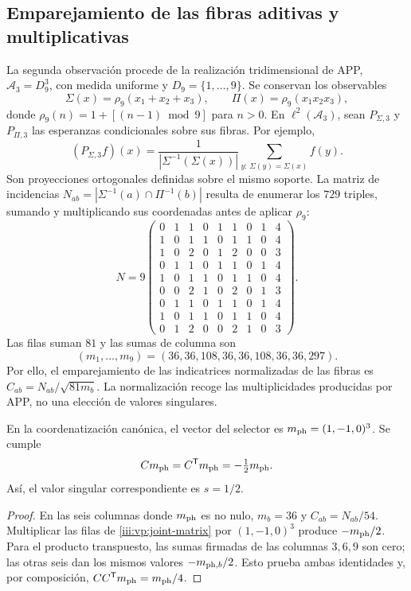 \subsection{Emparejamiento de las fibras aditivas y multiplicativas}

La segunda observación procede de la realización tridimensional de APP,
$\mathcal A_3=D_9^3$, con medida uniforme y
$D_9=\{1,\ldots,9\}$. Se conservan los observables
\[
 \Sigma(x)=\rho_9(x_1+x_2+x_3),\qquad
 \Pi(x)=\rho_9(x_1x_2x_3),
\]
donde $\rho_9(n)=1+[(n-1)\bmod9]$ para $n>0$. En
$\ell^2(\mathcal A_3)$, sean $P_{\Sigma,3}$ y $P_{\Pi,3}$ las
esperanzas condicionales sobre sus fibras. Por ejemplo,
\[
 (P_{\Sigma,3}f)(x)=
 \frac1{|\Sigma^{-1}(\Sigma(x))|}
 \sum_{y:\,\Sigma(y)=\Sigma(x)}f(y).
\]
Son proyecciones ortogonales definidas sobre el mismo soporte. La matriz
de incidencias $N_{ab}=|\Sigma^{-1}(a)\cap\Pi^{-1}(b)|$ resulta de
enumerar los $729$ triples, sumando y multiplicando sus coordenadas antes
de aplicar $\rho_9$:
\begin{equation}
 N=9\begin{pmatrix}
 0&1&1&0&1&1&0&1&4\\
 1&0&1&1&0&1&1&0&4\\
 1&0&2&0&1&2&0&0&3\\
 0&1&1&0&1&1&0&1&4\\
 1&0&1&1&0&1&1&0&4\\
 0&0&2&1&0&2&0&1&3\\
 0&1&1&0&1&1&0&1&4\\
 1&0&1&1&0&1&1&0&4\\
 0&1&2&0&0&2&1&0&3
 \end{pmatrix}.
 \label{iii:vp:joint-matrix}
\end{equation}
Las filas suman $81$ y las sumas de columna son
\[
 (m_1,\ldots,m_9)=(36,36,108,36,36,108,36,36,297).
\]
Por ello, el emparejamiento de las indicatrices normalizadas de las fibras
es $C_{ab}=N_{ab}/\sqrt{81m_b}$. La normalización recoge las
multiplicidades producidas por APP, no una elección de valores singulares.

\begin{proposition}
En la coordenatización canónica, el vector del selector es
$m_{\rm ph}=(1,-1,0)^3$. Se cumple
\begin{equation}
 Cm_{\rm ph}=C^{\mathsf T}m_{\rm ph}=-\tfrac12m_{\rm ph}.
 \label{iii:vp:trit-mode}
\end{equation}
Así, el valor singular correspondiente es $s=1/2$.
\end{proposition}
\begin{proof}
En las seis columnas donde $m_{\rm ph}$ es no nulo, $m_b=36$ y
$C_{ab}=N_{ab}/54$. Multiplicar las filas de
\eqref{iii:vp:joint-matrix} por $(1,-1,0)^3$ produce
$-m_{\rm ph}/2$. Para el producto transpuesto, las sumas firmadas
de las columnas $3,6,9$ son cero; las otras seis dan los mismos
valores $-m_{{\rm ph},b}/2$. Esto prueba ambas identidades y, por
composición, $CC^{\mathsf T}m_{\rm ph}=m_{\rm ph}/4$.
\end{proof}


